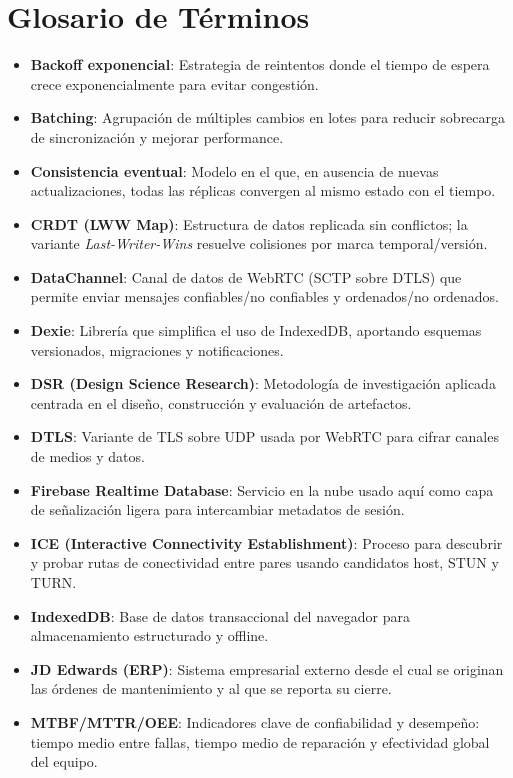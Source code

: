 \documentclass[10pt,a4paper]{report}
\begin{document}
\chapter*{Glosario de Términos}
\begin{itemize}
    \item \textbf{Backoff exponencial}: Estrategia de reintentos donde el tiempo de espera crece exponencialmente para evitar congestión.
    \item \textbf{Batching}: Agrupación de múltiples cambios en lotes para reducir sobrecarga de sincronización y mejorar performance.
    \item \textbf{Consistencia eventual}: Modelo en el que, en ausencia de nuevas actualizaciones, todas las réplicas convergen al mismo estado con el tiempo.
    \item \textbf{CRDT (LWW Map)}: Estructura de datos replicada sin conflictos; la variante \textit{Last-Writer-Wins} resuelve colisiones por marca temporal/versión.
    \item \textbf{DataChannel}: Canal de datos de WebRTC (SCTP sobre DTLS) que permite enviar mensajes confiables/no confiables y ordenados/no ordenados.
    \item \textbf{Dexie}: Librería que simplifica el uso de IndexedDB, aportando esquemas versionados, migraciones y notificaciones.
    \item \textbf{DSR (Design Science Research)}: Metodología de investigación aplicada centrada en el diseño, construcción y evaluación de artefactos.
    \item \textbf{DTLS}: Variante de TLS sobre UDP usada por WebRTC para cifrar canales de medios y datos.
    \item \textbf{Firebase Realtime Database}: Servicio en la nube usado aquí como capa de señalización ligera para intercambiar metadatos de sesión.
    \item \textbf{ICE (Interactive Connectivity Establishment)}: Proceso para descubrir y probar rutas de conectividad entre pares usando candidatos host, STUN y TURN.
    \item \textbf{IndexedDB}: Base de datos transaccional del navegador para almacenamiento estructurado y offline.
    \item \textbf{JD Edwards (ERP)}: Sistema empresarial externo desde el cual se originan las órdenes de mantenimiento y al que se reporta su cierre.
    \item \textbf{MTBF/MTTR/OEE}: Indicadores clave de confiabilidad y desempeño: tiempo medio entre fallas, tiempo medio de reparación y efectividad global del equipo.

\end{itemize}
\end{document}
